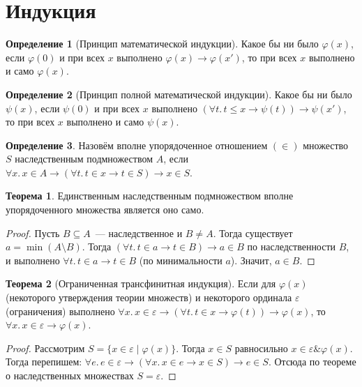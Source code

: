 \documentclass[a4paper,11pt]{article}
\theoremstyle{definition}
\newtheorem*{thm}{Теорема}
\newtheorem*{dfn}{Определение}
\newcommand{\amp}{\mathbin{\&}}
\begin{document}
\section{Индукция}
\begin{dfn}[Принцип математической индукции]
Какое бы ни было $\varphi(x)$, если $\varphi(0)$ и при всех $x$ выполнено
$\varphi(x) \to \varphi(x')$, то при всех $x$ выполнено и само $\varphi(x)$.
\end{dfn}
\begin{dfn}[Принцип полной математической индукции]
Какое бы ни было $\psi(x)$, если $\psi(0)$ и при всех $x$ выполнено $(\forall
t.\,t \le x \to \psi(t)) \to \psi(x')$, то при всех $x$ выполнено и само
$\psi(x)$.
\end{dfn}
\begin{dfn}
Назовём вполне упорядоченное отношением $(\in)$ множество $S$ наследственным
подмножеством $A$, если $\forall x.\,x \in A \to (\forall t.\,t \in x \to t \in
S) \to x \in S$.
\end{dfn}
\begin{thm}
Единственным наследственным подмножеством вполне упорядоченного множества
является оно само.
\end{thm}
\begin{proof}
Пусть $B \subseteq A$~--- наследственное и $B \ne A$. Тогда существует $a =
\min(A \setminus B)$. Тогда $(\forall t.\,t \in a \to t \in B) \to a \in B$ по
наследственности $B$, и выполнено $\forall t.\,t \in a \to t \in B$ (по
минимальности $a$). Значит, $a \in B$.
\end{proof}

\begin{thm}[Ограниченная трансфинитная индукция]
Если для $\varphi(x)$ (некоторого утверждения теории множеств) и некоторого
ординала $\varepsilon$ (ограничения) выполнено $\forall x.\,x \in \varepsilon
\to (\forall t.\,t \in x \to \varphi(t)) \to \varphi(x)$, то $\forall x.\,x \in
\varepsilon \to \varphi(x)$.
\end{thm}
\begin{proof}
Рассмотрим $S = \{x \in \varepsilon \mid \varphi(x)\}$. Тогда $x \in S$
равносильно $x \in \varepsilon \amp \varphi(x)$. Тогда перепишем: $\forall e.\,e
\in \varepsilon \to (\forall x.\,x \in e \to x \in S) \to e \in S$. Отсюда по
теореме о наследственных множествах $S = \varepsilon$.
\end{proof}
\end{document}
